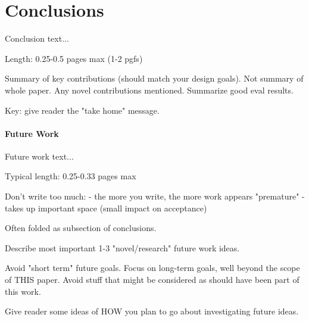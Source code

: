 \section{Conclusions}
\label{conc}

Conclusion text...

Length: 0.25-0.5 pages max (1-2 pgfs)

Summary of key contributions (should match your design goals).
Not summary of whole paper.  Any novel contributions mentioned.
Summarize good eval results.

Key: give reader the "take home" message.

\paragraph{Future Work}
%
Future work text...

Typical length: 0.25-0.33 pages max

Don't write too much:
- the more you write, the more work appears "premature"
- takes up important space (small impact on acceptance)

Often folded as subsection of conclusions.

Describe most important 1-3 "novel/research" future work ideas.

Avoid "short term" future goals.  Focus on long-term goals, well
beyond the scope of THIS paper.  Avoid stuff that might be
considered as should have been part of this work.

Give reader some ideas of HOW you plan to go about investigating
future ideas.


